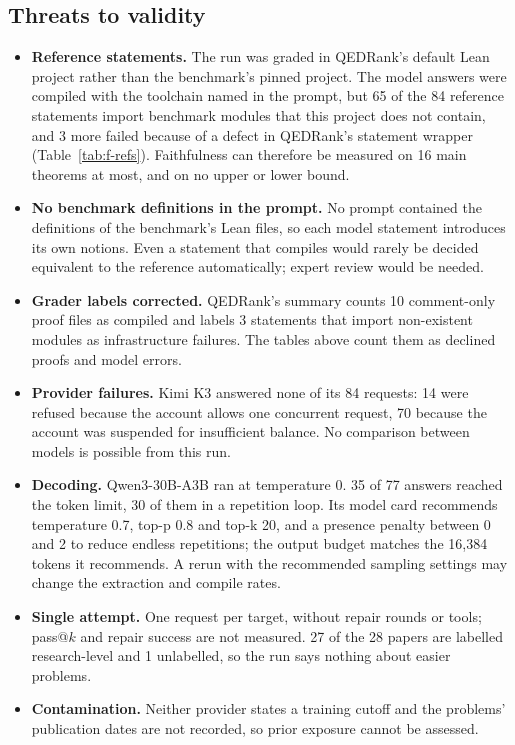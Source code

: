 \documentclass[11pt]{article}
\begin{document}
\subsection*{Threats to validity}
\begin{itemize}\setlength\itemsep{2pt}
\item \textbf{Reference statements.} The run was graded in QEDRank's default Lean project rather than the benchmark's pinned project. The model answers were compiled with the toolchain named in the prompt, but 65 of the 84 reference statements import benchmark modules that this project does not contain, and 3 more failed because of a defect in QEDRank's statement wrapper (Table~\ref{tab:f-refs}). Faithfulness can therefore be measured on 16 main theorems at most, and on no upper or lower bound.
\item \textbf{No benchmark definitions in the prompt.} No prompt contained the definitions of the benchmark's Lean files, so each model statement introduces its own notions. Even a statement that compiles would rarely be decided equivalent to the reference automatically; expert review would be needed.
\item \textbf{Grader labels corrected.} QEDRank's summary counts 10 comment-only proof files as compiled and labels 3 statements that import non-existent modules as infrastructure failures. The tables above count them as declined proofs and model errors.
\item \textbf{Provider failures.} Kimi K3 answered none of its 84 requests: 14 were refused because the account allows one concurrent request, 70 because the account was suspended for insufficient balance. No comparison between models is possible from this run.
\item \textbf{Decoding.} Qwen3-30B-A3B ran at temperature 0. 35 of 77 answers reached the token limit, 30 of them in a repetition loop. Its model card recommends temperature 0.7, top-p 0.8 and top-k 20, and a presence penalty between 0 and 2 to reduce endless repetitions; the output budget matches the 16{,}384 tokens it recommends. A rerun with the recommended sampling settings may change the extraction and compile rates.
\item \textbf{Single attempt.} One request per target, without repair rounds or tools; pass@$k$ and repair success are not measured. 27 of the 28 papers are labelled research-level and 1 unlabelled, so the run says nothing about easier problems.
\item \textbf{Contamination.} Neither provider states a training cutoff and the problems' publication dates are not recorded, so prior exposure cannot be assessed.
\end{itemize}
\end{document}
